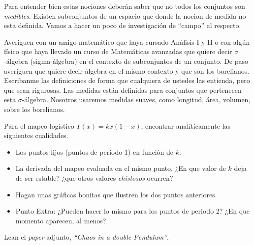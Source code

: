 \documentclass[12pt]{article}
\newenvironment{question}[2][Pregunta]{\begin{trivlist}
\item[\hskip \labelsep {\bfseries #1}\hskip \labelsep {\bfseries #2.}]}{\end{trivlist}}
\begin{document}
Para entender bien estas nociones deberán saber que no todos los conjuntos
son \emph{medibles}. Existen subconjuntos de un espacio que donde la 
nocion de medida no esta definida. Vamos a hacer un poco de investigación
de ``campo'' al respecto.


\begin{question}{1}
Averiguen con un amigo matemático que haya cursado Análisis I y II o con algún
físico que haya llevado un curso de Matemáticas avanzadas que
quiere decir $\sigma$-álgebra (sigma-álgebra) en el contexto de 
subconjuntos de un conjunto. 
De paso averiguen que quiere decir álgebra en el mismo contexto y que son
los borelianos. Escribanme las definiciones de forma que cualquiera de 
ustedes las entienda, pero que sean rigurosas. Las medidas están definidas
para conjuntos que pertenecen esta $\sigma$-álgebra. Nosotros
usaremos medidas suaves, como longitud, área, volumen, sobre los borelianos.
\end{question}


\begin{question}{2}
Para el mapeo logístico $T(x)=kx(1-x)$, encontrar analíticamente
las siguientes cualidades. 
\begin{itemize} 
\item Los puntos fijos (puntos de periodo 1) en función de $k$.
\item La derivada del mapeo evaluada en el mismo punto. ¿En que valor
de $k$ deja de ser estable? ¿que otros valores \emph{chistosos} ocurren?
\item Hagan unas gráficas bonitas que ilustren los dos puntos anteriores. 
\item Punto Extra: ¿Pueden hacer lo mismo para los puntos de periodo 2?
  ¿En que momento aparecen, al menos?
\end{itemize}
\end{question}
 
\begin{question}{3}
Lean el \emph{paper} adjunto, \emph{``Chaos in a double Pendulum''}.
\end{question}
\end{document}
